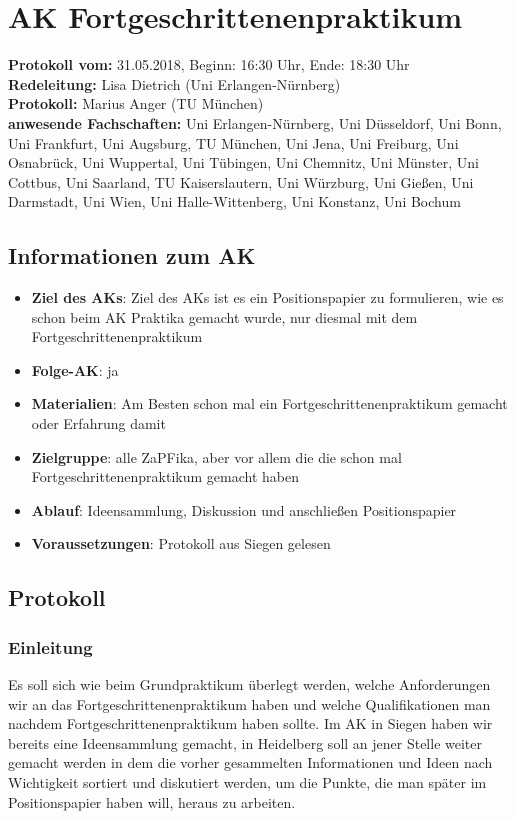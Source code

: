 
\section{AK Fortgeschrittenenpraktikum}

\textbf{Protokoll vom:} 31.05.2018,
Beginn: 16:30 Uhr,
Ende: 18:30 Uhr \\
\textbf{Redeleitung:} Lisa Dietrich (Uni Erlangen-Nürnberg) \\
\textbf{Protokoll:} Marius Anger (TU München) \\
\textbf{anwesende Fachschaften:} Uni Erlangen-Nürnberg, Uni Düsseldorf, Uni Bonn, Uni Frankfurt, Uni Augsburg,
TU München, Uni Jena, Uni Freiburg, Uni Osnabrück, Uni Wuppertal, Uni Tübingen, Uni Chemnitz, Uni Münster, Uni Cottbus, Uni Saarland,
TU Kaiserslautern, Uni Würzburg, Uni Gießen, Uni Darmstadt, Uni Wien, Uni Halle-Wittenberg, Uni Konstanz, Uni Bochum

\subsection*{Informationen zum AK}
	\begin{itemize}
		\item \textbf{Ziel des AKs}: Ziel des AKs ist es ein Positionspapier zu formulieren, wie es schon beim AK Praktika gemacht wurde, nur diesmal mit dem Fortgeschrittenenpraktikum
		\item \textbf{Folge-AK}: ja
	  \item \textbf{Materialien}: Am Besten schon mal ein Fortgeschrittenenpraktikum gemacht oder Erfahrung damit
		\item \textbf{Zielgruppe}: alle ZaPFika, aber vor allem die die schon mal Fortgeschrittenenpraktikum gemacht haben
		\item \textbf{Ablauf}: Ideensammlung, Diskussion und anschließen Positionspapier
		\item \textbf{Voraussetzungen}: Protokoll aus Siegen gelesen
	\end{itemize}

\subsection*{Protokoll}
  \subsubsection*{Einleitung}
    Es soll sich wie beim Grundpraktikum überlegt werden, welche Anforderungen wir an das Fortgeschrittenenpraktikum haben und welche Qualifikationen man nachdem Fortgeschrittenenpraktikum haben sollte. Im AK in Siegen haben wir bereits eine Ideensammlung gemacht, in Heidelberg soll an jener Stelle weiter gemacht werden in dem die vorher gesammelten Informationen und Ideen nach Wichtigkeit sortiert und diskutiert werden, um die Punkte, die man später im Positionspapier haben will, heraus zu arbeiten.

